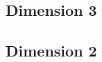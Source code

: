 \documentclass[10pt, oneside]{article}
\begin{document}
\subsection{Dimension 3}


\subsection{Dimension 2}


\pagestyle{bib}
\printbibliography
\end{document}
